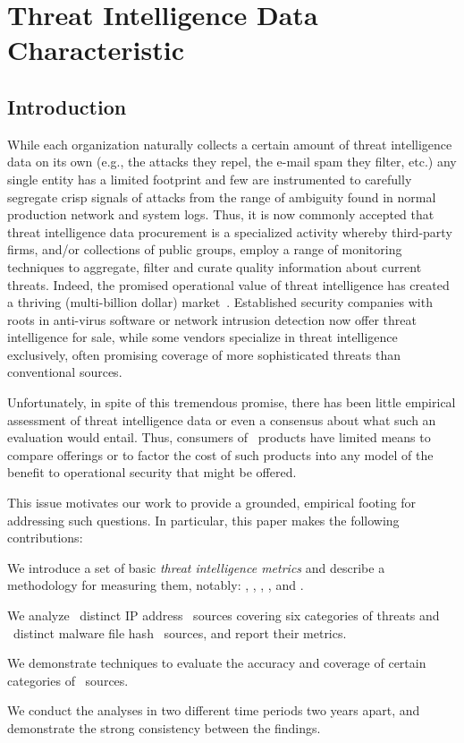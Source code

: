 \chapter{Threat Intelligence Data Characteristic}

\section{Introduction}

While each organization naturally collects a certain amount of threat
intelligence data on its own (e.g., the attacks they repel, the e-mail
spam they filter, etc.) any single entity has a limited footprint and
few are instrumented to carefully segregate crisp signals of attacks
from the range of ambiguity found in normal production network and
system logs.  Thus, it is now commonly accepted that threat
intelligence data procurement is a specialized activity whereby
third-party firms, and/or collections of public groups, employ a range
of monitoring techniques to aggregate, filter and curate quality
information about current threats.  Indeed, the promised operational
value of threat intelligence has created a thriving (multi-billion
dollar) market~\cite{timarket}. Established security companies with
roots in anti-virus software or network intrusion detection now offer
threat intelligence for sale, while some vendors specialize in threat
intelligence exclusively, often promising coverage of more
sophisticated threats than conventional sources.

Unfortunately, in spite of this tremendous promise, there has been
little empirical assessment of threat intelligence data or even a
consensus about what such an evaluation would entail.  Thus, consumers
of \ti\ products have limited means to compare offerings
or to factor the cost of such products into any model of the benefit
to operational security that might be offered.

This issue motivates our work to provide a grounded,
empirical footing for addressing such questions.  In particular, this
paper makes the following contributions:
\begin{prettylist}
\item We introduce a set of basic \emph{threat intelligence metrics}
and describe a methodology for measuring them, notably: ,
, ,
,  and .
\item We analyze \numipfeeds\ distinct IP address \ti\ sources covering
six categories of threats and \numhashfeeds\ distinct malware file hash
\ti\ sources, and report their metrics.
\item We demonstrate techniques to evaluate the accuracy and coverage of
certain categories of \ti\ sources.
\item We conduct the analyses in two different time periods two years apart,
and demonstrate the strong consistency between the findings.
\end{prettylist}

